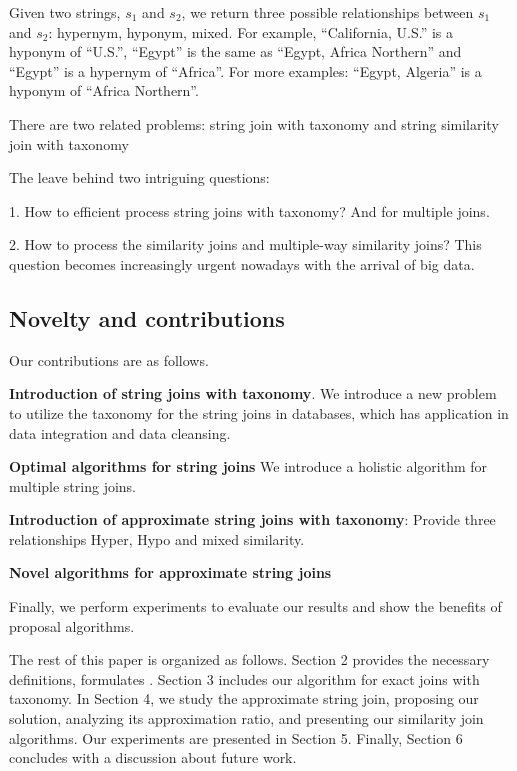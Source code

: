 Given two strings, $s_1$ and $s_2$, we return three possible relationships between $s_1$ and $s_2$: hypernym, hyponym, mixed. For example, ``California, U.S.'' is a hyponym of ``U.S.'', ``Egypt'' is the same as ``Egypt, Africa Northern'' and ``Egypt'' is a hypernym of ``Africa''. For more examples: ``Egypt, Algeria'' is a hyponym of ``Africa Northern''.

There are two related problems: string join with taxonomy and string similarity join with taxonomy

The leave behind two intriguing questions:

1. How to efficient process string joins with taxonomy? And for multiple joins.


2. How to process the similarity joins and multiple-way similarity joins?  This question becomes increasingly urgent nowadays with the arrival of big data.





\subsection{Novelty and contributions}


\smallskip


Our contributions are as follows.

\noindent \textbf{Introduction of string joins with taxonomy}. We introduce a new problem to utilize the taxonomy for the string joins in databases, which has application in data integration and data cleansing.

\noindent \textbf{Optimal algorithms for string joins} We introduce a holistic algorithm for multiple string joins.

\noindent \textbf{Introduction of approximate string joins with taxonomy}: Provide three relationships Hyper, Hypo and mixed similarity.

\noindent \textbf{Novel algorithms for approximate string joins}


Finally, we perform experiments to evaluate our results and show the benefits of proposal algorithms.


\smallskip

The rest of this paper is organized as follows. Section 2
provides the necessary definitions, formulates . Section
3 includes our algorithm for exact joins with taxonomy. In Section 4, we study
the approximate string join, proposing our solution, analyzing its approximation
ratio, and presenting our similarity join algorithms.
Our experiments are presented in Section 5. Finally,
Section 6 concludes with a discussion about future work.
